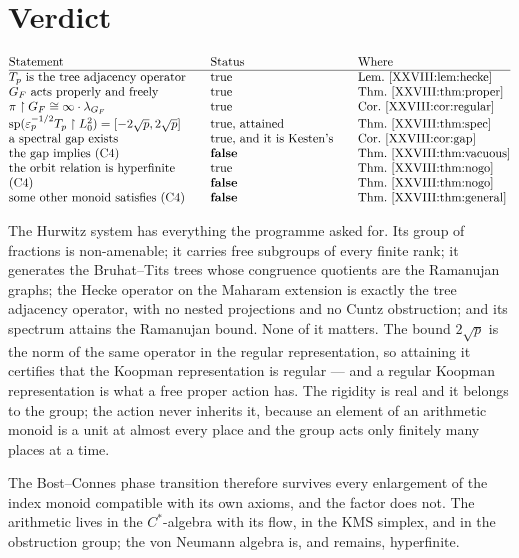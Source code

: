 \section{Verdict}\label{XXVIII:sec:verdict}

\[
\begin{array}{@{}l@{\qquad}l@{\qquad}l@{}}
\text{Statement} & \text{Status} & \text{Where}\\\hline
T_p\ \text{is the tree adjacency operator} & \text{true} & \text{Lem.~\ref{XXVIII:lem:hecke}}\\
G_F\ \text{acts properly and freely} & \text{true} & \text{Thm.~\ref{XXVIII:thm:proper}}\\
\pi\restriction G_F\cong\infty\cdot\lambda_{G_F} & \text{true} & \text{Cor.~\ref{XXVIII:cor:regular}}\\
\mathrm{sp}(\varepsilon_p^{-1/2}T_p\restriction L^2_0)=[-2\sqrt p,2\sqrt p] & \text{true, attained} & \text{Thm.~\ref{XXVIII:thm:spec}}\\
\text{a spectral gap exists} & \text{true, and it is Kesten's} & \text{Cor.~\ref{XXVIII:cor:gap}}\\
\text{the gap implies (C4)} & \textbf{false} & \text{Thm.~\ref{XXVIII:thm:vacuous}}\\
\text{the orbit relation is hyperfinite} & \text{true} & \text{Thm.~\ref{XXVIII:thm:nogo}}\\
\text{(C4)} & \textbf{false} & \text{Thm.~\ref{XXVIII:thm:nogo}}\\
\text{some other monoid satisfies (C4)} & \textbf{false} & \text{Thm.~\ref{XXVIII:thm:general}}
\end{array}
\]

The Hurwitz system has everything the programme asked for. Its group of fractions is
non-amenable; it carries free subgroups of every finite rank; it generates the Bruhat--Tits trees
whose congruence quotients are the Ramanujan graphs; the Hecke operator on the Maharam extension
is exactly the tree adjacency operator, with no nested projections and no Cuntz obstruction; and
its spectrum attains the Ramanujan bound. None of it matters. The bound $2\sqrt p$ is the norm of
the same operator in the regular representation, so attaining it certifies that the Koopman
representation is regular --- and a regular Koopman representation is what a free proper action
has. The rigidity is real and it belongs to the group; the action never inherits it, because an
element of an arithmetic monoid is a unit at almost every place and the group acts only finitely
many places at a time.

The Bost--Connes phase transition therefore survives every enlargement of the index monoid
compatible with its own axioms, and the factor does not. The arithmetic lives in the
$C^*$-algebra with its flow, in the $\mathrm{KMS}$ simplex, and in the obstruction group; the von
Neumann algebra is, and remains, hyperfinite.

